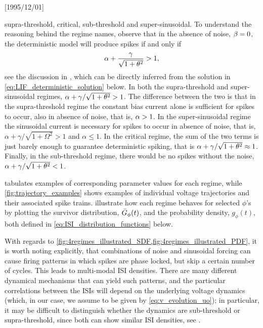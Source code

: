 \NeedsTeXFormat{LaTeX2e}[1995/12/01] \documentclass[10pt]{bmc_article}
\newenvironment{bmcformat}{\begin{raggedright}\baselineskip20pt\sloppy\setboolean{publ}{false}}{\end{raggedright}\baselineskip20pt\sloppy}
\begin{document}
\begin{bmcformat}
supra-threshold, critical, sub-threshold and super-sinusoidal. 
To understand the reasoning behind the regime names, observe that in the absence
of noise, ${\beta}=0$, the deterministic model will produce spikes if and only if $$
{\alpha} + \frac{{\gamma }}{\sqrt{1 + {\theta}^2} } > 1, $$ see the discussion in
\cite{Burkitt2006b}, which can be directly inferred from the solution in
\cref{eq:LIF_deterministic_solution} below. In both the supra-threshold and
super-sinusoidal regimes, $ {\alpha} + {\gamma }/\sqrt{1 + {\theta}^2}  > 1$. The
difference between the two is that in the supra-threshold regime the constant
bias current alone is sufficient for spikes to occur, also in absence of noise,
that is,  ${\alpha} > 1$. In the super-sinusoidal regime the sinusoidal current is
necessary for spikes to occur in absence of noise, that is, $\alpha +
\gamma /
\sqrt{1+\Omega^2} > 1$ and $\alpha \leq 1$. In the critical regime, the sum of
the two terms is just barely enough to guarantee deterministic spiking, that is
${\alpha} + {\gamma } / \sqrt{1 + {\theta}^2}  \approx 1$. Finally, in the sub-threshold regime,
there would be no spikes without the noise, $ {\alpha} + {\gamma } / \sqrt{1 + {\theta}^2} < 1$.

 tabulates examples of corresponding parameter values for each
regime, while \cref{fig:trajectory_examples} shows examples of individual
voltage trajectories and their associated spike trains.
 illustrate
 how each regime behaves for selected $\phi$'s by plotting the survivor
 distribution, ${ \bar{G} }_{\phi}(t)$, and the probability density, $g_{\phi}(t)$, both
 defined in \cref{eq:ISI_distribution_functions} below.
 
With regards to
\cref{fig:4regimes_illustrated_SDF,fig:4regimes_illustrated_PDF}, it is worth
noting explicitly, that combinations of noise and sinusoidal forcing can cause
firing patterns in which spikes are phase locked, but skip a certain number of
cycles. This leads to multi-modal ISI densities. There are many different
dynamical mechanisms that can yield such patterns, and the particular
correlations between the ISIs will depend on the underlying voltage dynamics
(which, in our case, we assume to be given by \cref{eq:v_evolution_uo}); in
particular, it may be difficult to distinguish whether the dynamics are
sub-threshold or supra-threshold, since both can show similar ISI densities,
see \cite{Longtin1995}.



\end{bmcformat}
\end{document}
